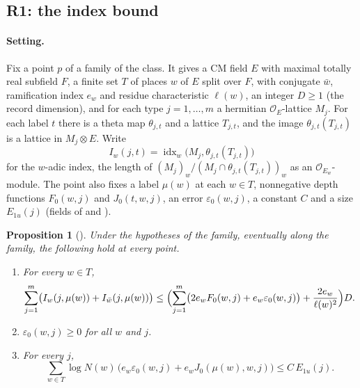 \documentclass[11pt]{article}
\newtheorem{proposition}[theorem]{Proposition}
\theoremstyle{remark}
\begin{document}
\subsection{R1: the index bound }\label{sec:fu4r1}

\paragraph{Setting.} Fix a point $p$ of a family of the class. It gives a CM field $E$ with maximal totally real subfield $F$, a finite set $T$ of places $w$ of $E$ split over $F$, with conjugate $\bar w$, ramification index $e_w$ and residue characteristic $\ell(w)$, an integer $D\ge1$ (the record dimension), and for each type $j=1,\dots,m$ a hermitian $\mathcal O_E$-lattice $M_j$. For each label $t$ there is a theta map $\theta_{j,t}$ and a lattice $T_{j,t}$, and the image $\theta_{j,t}(T_{j,t})$ is a lattice in $M_j\otimes E$. Write
\[
I_w(j,t)=\operatorname{idx}_w\bigl(M_j,\theta_{j,t}(T_{j,t})\bigr)
\]
for the $w$-adic index, the length of $(M_j)_w/(M_j\cap\theta_{j,t}(T_{j,t}))_w$ as an $\mathcal O_{E_w}$-module. The point also fixes a label $\mu(w)$ at each $w\in T$, nonnegative depth functions $F_0(w,j)$ and $J_0(t,w,j)$, an error $\varepsilon_0(w,j)$, a constant $C$ and a size $E_{1u}(j)$ (fields of  and ).

\begin{proposition}[]\label{prop:on4}
Under the hypotheses of the family, eventually along the family, the following hold at every point.
\begin{enumerate}[label=(\roman*),nosep]
\item For every $w\in T$,
\[
\sum_{j=1}^m\bigl(I_w(j,\mu(w))+I_{\bar w}(j,\mu(w))\bigr)\le\Bigl(\sum_{j=1}^m\bigl(2e_wF_0(w,j)+e_w\varepsilon_0(w,j)\bigr)+\frac{2e_w}{\ell(w)^2}\Bigr)D .
\]
\item $\varepsilon_0(w,j)\ge0$ for all $w$ and $j$.
\item For every $j$,
\[
\sum_{w\in T}\log N(w)\,\bigl(e_w\varepsilon_0(w,j)+e_wJ_0(\mu(w),w,j)\bigr)\le C\,E_{1u}(j).
\]
\end{enumerate}
\end{proposition}
\end{document}
